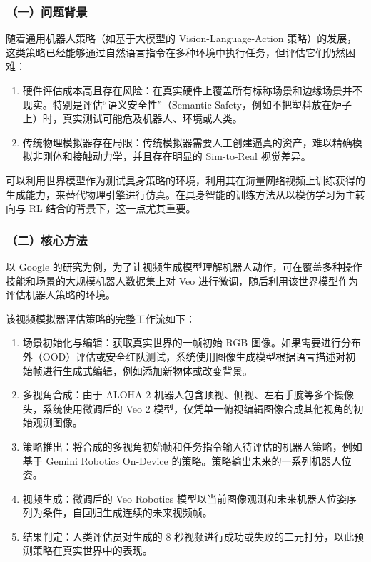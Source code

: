\hypertarget{ux4e00ux95eeux9898ux80ccux666f-17}{%
\subsubsection{（一）问题背景}\label{ux4e00ux95eeux9898ux80ccux666f-17}}

随着通用机器人策略（如基于大模型的 Vision-Language-Action 策略）的发展，这类策略已经能够通过自然语言指令在多种环境中执行任务，但评估它们仍然困难：

\begin{enumerate}
\def\labelenumi{\arabic{enumi}.}
\tightlist
\item
  硬件评估成本高且存在风险：在真实硬件上覆盖所有标称场景和边缘场景并不现实。特别是评估``语义安全性''（Semantic Safety，例如不把塑料放在炉子上）时，真实测试可能危及机器人、环境或人类。
\item
  传统物理模拟器存在局限：传统模拟器需要人工创建逼真的资产，难以精确模拟非刚体和接触动力学，并且存在明显的 Sim-to-Real 视觉差异。
\end{enumerate}

可以利用世界模型作为测试具身策略的环境，利用其在海量网络视频上训练获得的生成能力，来替代物理引擎进行仿真。在具身智能的训练方法从以模仿学习为主转向与 RL 结合的背景下，这一点尤其重要。

\hypertarget{ux4e8cux6838ux5fc3ux65b9ux6cd5}{%
\subsubsection{（二）核心方法}\label{ux4e8cux6838ux5fc3ux65b9ux6cd5}}

以 Google 的研究为例，为了让视频生成模型理解机器人动作，可在覆盖多种操作技能和场景的大规模机器人数据集上对 Veo 进行微调，随后利用该世界模型作为评估机器人策略的环境。

该视频模拟器评估策略的完整工作流如下：

\begin{enumerate}
\def\labelenumi{\arabic{enumi}.}
\tightlist
\item
  场景初始化与编辑：获取真实世界的一帧初始 RGB 图像。如果需要进行分布外（OOD）评估或安全红队测试，系统使用图像生成模型根据语言描述对初始帧进行生成式编辑，例如添加新物体或改变背景。
\item
  多视角合成：由于 ALOHA 2 机器人包含顶视、侧视、左右手腕等多个摄像头，系统使用微调后的 Veo 2 模型，仅凭单一俯视编辑图像合成其他视角的初始观测图像。
\item
  策略推出：将合成的多视角初始帧和任务指令输入待评估的机器人策略，例如基于 Gemini Robotics On-Device 的策略。策略输出未来的一系列机器人位姿。
\item
  视频生成：微调后的 Veo Robotics 模型以当前图像观测和未来机器人位姿序列为条件，自回归生成连续的未来视频帧。
\item
  结果判定：人类评估员对生成的 8 秒视频进行成功或失败的二元打分，以此预测策略在真实世界中的表现。
\end{enumerate}

